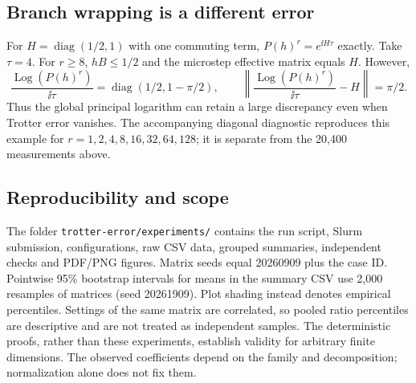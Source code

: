 \subsection{Branch wrapping is a different error}
For $H=\operatorname{diag}(1/2,1)$ with one commuting term, $P(h)^r=e^{\ii H\tau}$ exactly. Take $\tau=4$. For $r\geq8$, $hB\leq1/2$ and the microstep effective matrix equals $H$. However,
\begin{equation}
 \frac{\operatorname{Log}(P(h)^r)}{\ii\tau}
 =\operatorname{diag}(1/2,1-\pi/2),\qquad
 \left\lVert\frac{\operatorname{Log}(P(h)^r)}{\ii\tau}-H\right\rVert=\pi/2.
\end{equation}
Thus the global principal logarithm can retain a large discrepancy even when Trotter error vanishes. The accompanying diagonal diagnostic reproduces this example for $r=1,2,4,8,16,32,64,128$; it is separate from the 20,400 measurements above.

\subsection{Reproducibility and scope}
The folder \texttt{trotter-error/experiments/} contains the run script, Slurm submission, configurations, raw CSV data, grouped summaries, independent checks and PDF/PNG figures. Matrix seeds equal 20260909 plus the case ID. Pointwise 95\% bootstrap intervals for means in the summary CSV use 2,000 resamples of matrices (seed 20261909). Plot shading instead denotes empirical percentiles. Settings of the same matrix are correlated, so pooled ratio percentiles are descriptive and are not treated as independent samples. The deterministic proofs, rather than these experiments, establish validity for arbitrary finite dimensions. The observed coefficients depend on the family and decomposition; normalization alone does not fix them.
\clearpage

